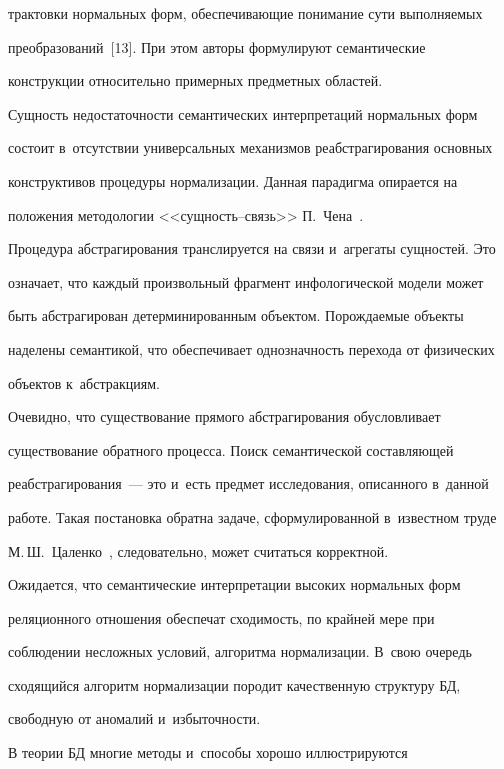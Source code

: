 трактовки нормальных форм, обеспечивающие понимание сути выполняемых 

преобразований~[13]. При этом авторы формулируют семантические 

конструкции относительно примерных предметных областей. 

  

  Сущность недостаточности семантических интерпретаций нормальных форм 

состоит в~отсутствии универсальных механизмов реабстрагирования основных 

конструктивов процедуры нормализации. Данная парадигма опирается на 

положения методологии <<сущ\-ность--связь>> П.~Чена~\cite{14-iv}. 

Процедура абстрагирования транслируется на связи и~агрегаты сущностей. Это 

означает, что каждый произвольный фрагмент инфологической модели может 

быть абстрагирован детерминированным объектом. Порождаемые объекты 

наделены семантикой, что обеспечивает однозначность перехода от физических 

объектов к~абстракциям.

  

  Очевидно, что существование прямого абстрагирования обусловливает 

существование обратного процесса. Поиск семантической составляющей 

реабстрагирования~--- это и~есть предмет исследования, описанного в~данной 

работе. Такая постановка обратна задаче, сформулированной в~известном труде 

М.\,Ш.~Цаленко~\cite{7-iv}, следовательно, может считаться корректной.

  

  Ожидается, что семантические интерпретации высоких нормальных форм 

реляционного отношения обеспечат сходимость, по крайней мере при 

соблюдении несложных условий, алгоритма нормализации. В~свою очередь 

сходящийся алгоритм нормализации породит качественную структуру БД, 

свободную от аномалий и~избыточности.

  

  В теории БД многие методы и~способы хорошо иллюстрируются 

